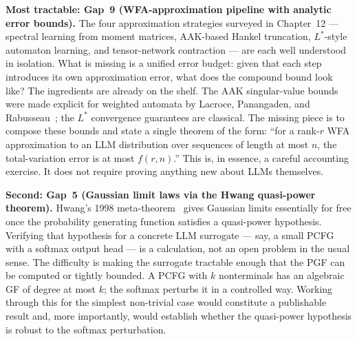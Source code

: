 \textbf{Most tractable: Gap~9 (WFA-approximation pipeline with analytic
error bounds).}  The four approximation strategies surveyed in
Chapter~12 --- spectral learning from moment matrices, AAK-based
Hankel truncation, $L^*$-style automaton learning, and tensor-network
contraction --- are each well understood in isolation.  What is missing
is a unified error budget: given that each step introduces its own
approximation error, what does the compound bound look like?  The
ingredients are already on the shelf.  The AAK singular-value bounds
were made explicit for weighted automata by Lacroce, Panangaden, and
Rabusseau~\cite{LacrocePanangadenRabusseau2021}; the $L^*$ convergence
guarantees are classical.  The missing piece is to compose these bounds
and state a single theorem of the form: ``for a rank-$r$ WFA
approximation to an LLM distribution over sequences of length at most
$n$, the total-variation error is at most $f(r,n)$.''  This is, in
essence, a careful accounting exercise.  It does not require proving
anything new about LLMs themselves.

\textbf{Second: Gap~5 (Gaussian limit laws via the Hwang quasi-power
theorem).}  Hwang's 1998 meta-theorem~\cite{Hwang1998} gives Gaussian
limits essentially for free once the probability generating function
satisfies a quasi-power hypothesis.  Verifying that hypothesis for a
concrete LLM surrogate --- say, a small PCFG with a softmax output head
--- is a calculation, not an open problem in the usual sense.  The
difficulty is making the surrogate tractable enough that the PGF can be
computed or tightly bounded.  A PCFG with $k$ nonterminals has an
algebraic GF of degree at most $k$; the softmax perturbs it in a
controlled way.  Working through this for the simplest non-trivial case
would constitute a publishable result and, more importantly, would
establish whether the quasi-power hypothesis is robust to the softmax
perturbation.

